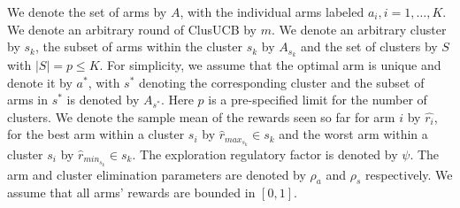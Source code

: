 We denote the set of arms by $A$, with the individual arms labeled $a_i, i=1,\ldots,K$.
We denote an arbitrary round of ClusUCB by $m$. We denote an arbitrary cluster by $s_{k}$, the subset of arms within the cluster $s_k$ by  $A_{s_{k}}$  and the set of clusters by $S$ with $|S|=p\leq K$. For simplicity, we assume that the optimal arm is unique and denote it by $a^{*}$, with $s^{*}$ denoting the corresponding cluster and the subset of arms in $s^{*}$ is denoted by $A_{s^{*}}$. Here $p$ is a pre-specified limit for the number of clusters. 
We denote the sample mean of the rewards seen so far for arm $i$ by $\hat{r_i}$, for the best arm within a cluster $s_i$ by $\hat{r}_{max_{s_{k}}}\in s_{k}$ and the worst arm within a cluster $s_i$ by $\hat{r}_{min_{s_{k}}}\in s_{k}$. The exploration regulatory factor is denoted by $\psi$. The arm and cluster elimination parameters are denoted by $\rho_{a}$ and $\rho_{s}$ respectively.
We assume that all arms' rewards are bounded in $[0,1]$.
